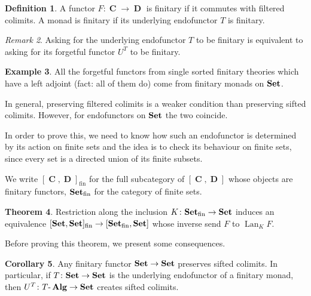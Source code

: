 \documentclass[a4paper,11pt,fullpage,oneside,openany]{amsbook}
\newcommand{\catname}[1]{{\normalfont\textbf{#1}}}
\DeclareMathOperator{\Alg}{\mathbf{Alg}}
\newcommand{\Set}{\catname{Set}}
\DeclareMathOperator{\C}{\mathbf{C}}
\DeclareMathOperator{\D}{\mathbf{D}}
\DeclareMathOperator{\Lan}{Lan}
\theoremstyle{definition}
\newtheorem{thm}{Theorem}[section] %
\theoremstyle{definition}
\newtheorem{defn}[thm]{Definition} %
\newtheorem{exmp}[thm]{Example} %
\newtheorem{cor}[thm]{Corollary}
\theoremstyle{remark}
\newtheorem{rmk}[thm]{Remark}
\begin{document}
\begin{defn}
	A functor $F\colon\C\rightarrow\D$ is finitary if it commutes with filtered colimits. A monad is finitary if its underlying endofunctor $T$ is finitary.
\end{defn}

\begin{rmk}
	Asking for the underlying endofunctor $T$ to be finitary is equivalent to asking for its forgetful functor $U^T$ to be finitary.
\end{rmk}

\begin{exmp}
	All the forgetful functors from single sorted finitary theories which have a left adjoint (fact: all of them do) come from finitary monads on $\Set$.
\end{exmp}

	In general, preserving filtered colimits is a weaker condition than preserving sifted colimits. However, for endofunctors on $\Set$ the two coincide.

	In order to prove this, we need to know how such an endofunctor is determined by its action on finite sets and the idea is to check its behaviour on finite sets, since every set is a directed union of its finite subsets.
	
	We write $[\C,\D]_\text{fin}$ for the full subcategory of $[\C,\D]$ whose objects are finitary functors, $\Set_\text{fin}$ for the category of finite sets.
	
	\begin{thm}
		Restriction along the inclusion $K\colon\Set_\text{fin}\rightarrow\Set$ induces an equivalence $[\Set,\Set]_\text{fin}\rightarrow[\Set_\text{fin},\Set]$ whose inverse send $F$ to $\Lan_KF$.
	\end{thm}

Before proving this theorem, we present some consequences.

\begin{cor}
	Any finitary functor $\Set\rightarrow\Set$ preserves sifted colimits. In particular, if $T\colon\Set\rightarrow\Set$ is the underlying endofunctor of a finitary monad, then $U^T\colon T\mbox{-}\Alg\rightarrow\Set$ creates sifted colimits.
\end{cor}
\end{document}
